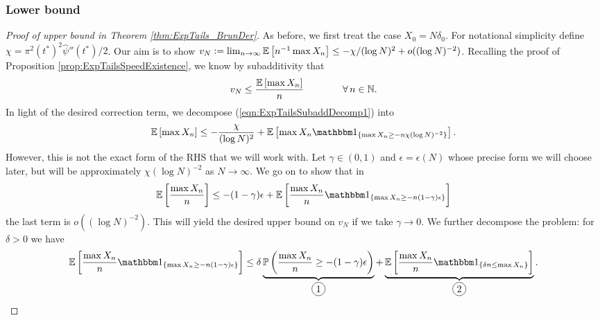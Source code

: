 \subsubsection{Lower bound}
\begin{proof}[Proof of upper bound in Theorem \ref{thm:ExpTails_BrunDer}]
As before, we first treat the case $X_0 = N \delta_0$. For notational simplicity define $\chi = \pi^2 (t^*)^2 \widehat{\psi}''(t^*) / 2$. Our aim is to show $v_N \vcentcolon= \lim_{n \to \infty} \mathbb{E}\left[ n^{-1} \max X_n \right] \leq -  \chi / (\log N)^2 + o((\log N)^{-2})$. Recalling the proof of Proposition \ref{prop:ExpTailsSpeedExistence}, we know by subadditivity that
\begin{equation}\label{eqn:ExpTailsSubaddDecomp1}
v_N \leq \frac{\mathbb{E}\left[ \max X_n \right]}{n} \qquad\qquad\forall\, n \in \mathbb{N}. 
\end{equation}
In light of the desired correction term, we decompose (\ref{eqn:ExpTailsSubaddDecomp1}) into
\begin{equation}\nonumber
\Ex{\max X_n} \leq - \frac{\chi}{(\log N)^2} + \Ex{\max X_n \Ind_{\{\max X_n \geq -n \chi (\log N)^{-2} \}}}. 
\end{equation}
However, this is not the exact form of the RHS that we will work with. Let $\gamma \in (0,1)$ and $\epsilon = \epsilon(N)$ whose precise form we will choose later, but will be approximately $\chi (\log N)^{-2}$ as $N \to \infty$. We go on to show that in
\begin{equation}\nonumber
\Ex{\frac{\max X_n}{n}} \leq  - (1 - \gamma)\epsilon + \Ex{\frac{\max X_n}{n} \Ind_{\{\max X_n \geq  -n (1 - \gamma) \epsilon \}}}
\end{equation}
the last term is $o((\log N)^{-2})$. This will yield the desired upper bound on $v_N$ if we take $\gamma \to 0$. We further decompose the problem: for $\delta > 0$ we have
\begin{equation}\nonumber 
\Ex{\frac{\max X_n}{n} \Ind_{\{\max X_n \geq - n (1 - \gamma)\epsilon \}}} \leq \delta\underbrace{\Pr{\frac{\max X_n}{n} \geq -(1 - \gamma)\epsilon }}_{\circled{1}} + \underbrace{\Ex{\frac{\max X_n}{n} \Ind_{\{ \delta n \leq \max X_n \}}}}_{\circled{2}}. 
\end{equation}

\end{proof}
